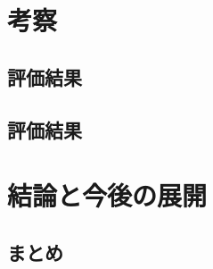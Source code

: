 \documentclass{funthesis}
\begin{document}




\chapter{考察}

\section{評価結果}


\section{評価結果}



\chapter{結論と今後の展開}

\section{まとめ}
\end{document}
